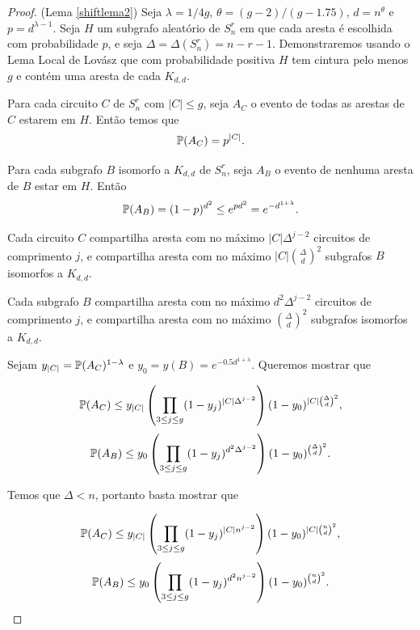 \begin{proof}(Lema \ref{shiftlema2})
Seja $\lambda = 1/4g$, $\theta = (g-2)/(g-1.75)$, $d = n^\theta$ e $p = d^{\lambda-1}$. Seja $H$ um subgrafo aleatório de $S_n^r$ em que cada aresta é escolhida com probabilidade $p$, e seja $\Delta = \Delta(S_n^r) = n-r-1$.
Demonstraremos usando o Lema Local de Lovász que com probabilidade positiva $H$ tem cintura pelo menos $g$ e contém uma aresta de cada $K_{d,d}$.

Para cada circuito $C$ de $S_n^r$ com $|C| \leq g$, seja $A_C$ o evento de todas as arestas de $C$ estarem em $H$. Então temos que \[\mathbb{P}(A_C) = p^{|C|}.\]

Para cada subgrafo $B$ isomorfo a $K_{d,d}$ de $S_n^r$, seja $A_B$ o evento de nenhuma aresta de $B$ estar em $H$. Então \[\mathbb{P}(A_B) = (1-p)^{d^2} \leq e^{pd^2} = e^{-d^{1+\lambda}}.\]

Cada circuito $C$ compartilha aresta com no máximo $|C|\Delta^{j-2}$ circuitos de comprimento $j$, e compartilha aresta com no máximo $|C|\binom{\Delta}{d}^2$ subgrafos $B$ isomorfos a $K_{d,d}$.

Cada subgrafo $B$ compartilha aresta com no máximo $d^2\Delta^{j-2}$ circuitos de comprimento $j$, e compartilha aresta com no máximo $\binom{\Delta}{d}^2$ subgrafos isomorfos a $K_{d,d}$.

Sejam $y_{|C|} = \mathbb{P}(A_C)^{1-\lambda}$ e $y_0 = y(B) = e^{-0.5d^{1+\lambda}}$. Queremos mostrar que

\begin{equation*}
\mathbb{P}(A_C) \leq y_{|C|}\left(\prod_{3\leq j\leq g}(1-y_j)^{|C|\Delta^{j-2}}\right)(1-y_0)^{|C|\binom{\Delta}{d}^2},
\end{equation*}
\begin{equation*}
\mathbb{P}(A_B)\leq y_0 \left(\prod_{3\leq j\leq g}(1-y_j)^{d^2\Delta^{j-2}}\right)(1-y_0)^{\binom{\Delta}{d}^2}.
\end{equation*}

Temos que $\Delta < n$, portanto basta mostrar que

\begin{equation}\label{shiftllleq1}
\mathbb{P}(A_C) \leq y_{|C|}\left(\prod_{3\leq j\leq g}(1-y_j)^{|C|n^{j-2}}\right)(1-y_0)^{|C|\binom{n}{d}^2},
\end{equation}
\begin{equation}\label{shiftllleq2}
\mathbb{P}(A_B)\leq y_0 \left(\prod_{3\leq j\leq g}(1-y_j)^{d^2n^{j-2}}\right)(1-y_0)^{\binom{n}{d}^2}.
\end{equation}


\end{proof}
